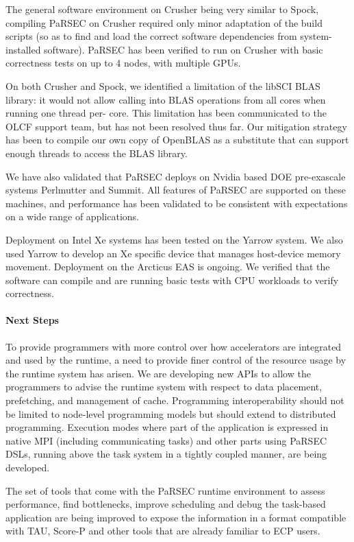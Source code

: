 The general software environment on Crusher being very similar to Spock, compiling PaRSEC
on Crusher required only minor adaptation of the build scripts (so as to find
and load the correct software dependencies from system-installed software).
PaRSEC has been verified to run on Crusher with basic correctness tests on up to 4 nodes, 
with multiple GPUs.

On both Crusher and Spock, we identified a limitation of the libSCI BLAS library:
it would not allow calling into BLAS operations from all cores when running one thread per-
core. This limitation has been communicated to the OLCF support team, but has not been
resolved thus far. Our mitigation strategy has been to compile our own copy of OpenBLAS as 
a substitute that can support enough threads to access the BLAS library.

We have also validated that PaRSEC deploys on Nvidia based DOE pre-exascale systems 
Perlmutter and Summit. All features of PaRSEC are supported on these machines, 
and performance has been validated to be consistent with expectations on a wide range
of applications.

Deployment on Intel Xe systems has been tested on the Yarrow system. We
also used Yarrow to develop an Xe specific device that manages host-device
memory movement. Deployment on the Arcticus EAS is ongoing. We verified that
the software can compile and are running basic tests with CPU workloads to verify
correctness.

\paragraph{Next Steps}
To provide programmers with more control over how accelerators are
integrated and used by the runtime, a need to provide finer control of the
resource usage by the runtime system has arisen. We are developing new APIs to
allow the programmers to advise the runtime system with respect to data
placement, prefetching, and management of cache.
%
Programming interoperability should not be limited to node-level programming
models but should extend to distributed programming. Execution modes where part
of the application is expressed in native MPI (including communicating tasks)
and other parts using PaRSEC DSLs, running above the task system in a tightly
coupled manner, are being developed.


The set of tools that come with the PaRSEC runtime environment to
assess performance, find bottlenecks, improve scheduling and debug the
task-based application are being improved to expose the information
in a format compatible with TAU, Score-P and other
tools that are already familiar to ECP users.
